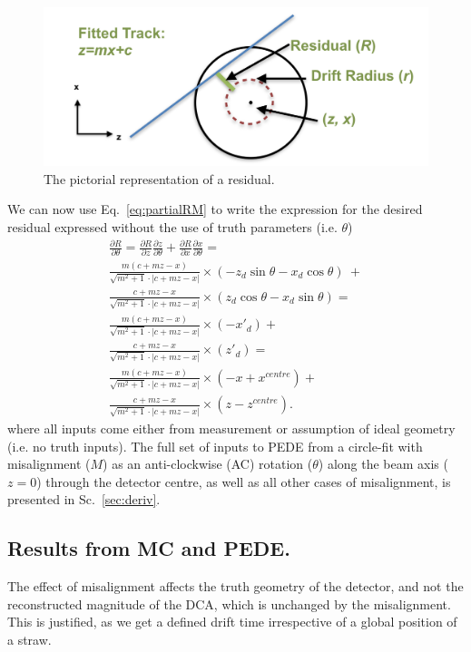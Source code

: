 \documentclass[a4paper,11pt]{article}
\begin{document}
\clearpage
\begin{figure}[!ht]
\centering
\includegraphics[width=0.6\linewidth]{fig/resPic.png}
\caption{The pictorial representation of a residual.}
\label{fig:resPic}
\end{figure}
We can now use Eq.~\ref{eq:partialRM} to write the expression for the desired residual expressed without the use of truth parameters (i.e. $\theta$)
\begin{equation}
\begin{split}
\frac{\partial R}{\partial\theta} = \frac{\partial R}{\partial z}\frac{\partial z}{\partial \theta} + \frac{\partial R}{\partial x}\frac{\partial x}{\partial \theta} = \\ \frac{ m(c+mz-x) }  { \sqrt{m^2+1} \cdot |c+mz-x| } \times (-z_d\sin \theta - x_d\cos \theta) \ + \\ \frac{ c+mz-x }  { \sqrt{m^2+1} \cdot |c+mz-x| } \times (z_d\cos \theta - x_d\sin \theta) = \\
\frac{ m(c+mz-x) }  { \sqrt{m^2+1} \cdot |c+mz-x| } \times (-x'_d) + \\ \frac{ c+mz-x }  { \sqrt{m^2+1} \cdot |c+mz-x| } \times (z'_d) = \\
\frac{ m(c+mz-x) }  { \sqrt{m^2+1} \cdot |c+mz-x| } \times (-x + x^{centre}) + \\ \frac{ c+mz-x }  { \sqrt{m^2+1} \cdot |c+mz-x| } \times (z - z^{centre}).
\end{split}
\end{equation}
where all inputs come either from measurement or assumption of ideal geometry (i.e. no truth inputs).
The full set of inputs to PEDE from a circle-fit with misalignment ($M$) as an anti-clockwise (AC) rotation ($\theta$) along the beam axis ($z=0$) through the detector centre, as well as all other cases of misalignment, is presented in Sc.~\ref{sec:deriv}.

\clearpage
\subsection{Results from MC and PEDE.}
The effect of misalignment affects the truth geometry of the detector, and not the reconstructed magnitude of the DCA, which is unchanged by the misalignment. This is justified, as we get a defined drift time irrespective of a global position of a straw. 
\end{document}
